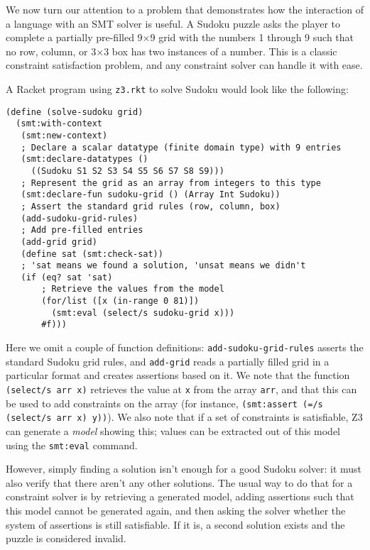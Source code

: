 We now turn our attention to a problem that demonstrates how the interaction of
a language with an SMT solver is useful. A Sudoku puzzle asks the player to
complete a partially pre-filled 9$\times$9 grid with the numbers 1 through 9
such that no row, column, or 3$\times$3 box has two instances of a number. This
is a classic constraint satisfaction problem, and any constraint solver can
handle it with ease.

A Racket program using \texttt{z3.rkt} to solve Sudoku would look like the
following:

\begin{verbatim}
(define (solve-sudoku grid)
  (smt:with-context
   (smt:new-context)
   ; Declare a scalar datatype (finite domain type) with 9 entries
   (smt:declare-datatypes ()
     ((Sudoku S1 S2 S3 S4 S5 S6 S7 S8 S9)))
   ; Represent the grid as an array from integers to this type
   (smt:declare-fun sudoku-grid () (Array Int Sudoku))
   ; Assert the standard grid rules (row, column, box)
   (add-sudoku-grid-rules)
   ; Add pre-filled entries
   (add-grid grid)
   (define sat (smt:check-sat))
   ; 'sat means we found a solution, 'unsat means we didn't
   (if (eq? sat 'sat)
       ; Retrieve the values from the model
       (for/list ([x (in-range 0 81)])
         (smt:eval (select/s sudoku-grid x)))
       #f)))
\end{verbatim}

Here we omit a couple of function definitions: \texttt{add-sudoku-grid-rules}
asserts the standard Sudoku grid rules, and \texttt{add-grid} reads a
partially filled grid in a particular format and creates assertions based on
it. We note that the function \texttt{(select/s arr x)} retrieves the value at
\texttt{x} from the array \texttt{arr}, and that this can be used to add
constraints on the array (for instance, \texttt{(smt:assert (=/s (select/s arr
x) y))}). We also note that if a set of constraints is satisfiable, Z3 can
generate a \textit{model} showing this; values can be extracted out of this
model using the \texttt{smt:eval} command.

However, simply finding a solution isn't enough for a good Sudoku solver: it
must also verify that there aren't any other solutions. The usual way to do
that for a constraint solver is by retrieving a generated model, adding
assertions such that this model cannot be generated again, and then asking the
solver whether the system of assertions is still satisfiable. If it is, a
second solution exists and the puzzle is considered invalid.

